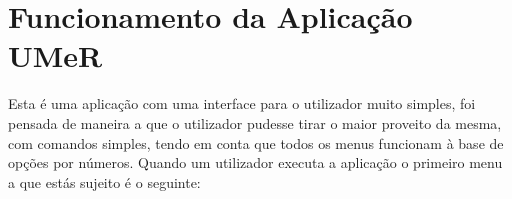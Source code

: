 \chapter{Funcionamento da Aplicação UMeR}
Esta é  uma aplicação com uma interface para o utilizador muito simples, foi pensada
de maneira a que o utilizador pudesse tirar o maior proveito da mesma, com comandos simples, tendo em conta que todos os menus funcionam à base de opções por números.
Quando um utilizador executa a aplicação o primeiro menu a que estás sujeito é o
seguinte: